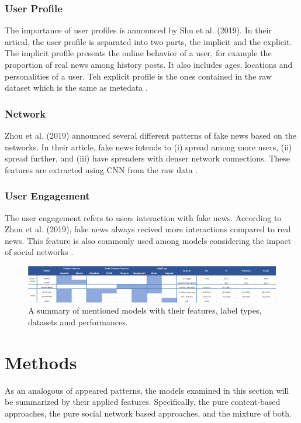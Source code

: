 \documentclass[sigconf ,nonacm]{acmart}
\begin{document}
\subsubsection{User Profile} The importance of user profiles is announced by Shu et al. (2019). In their artical, the user profile is separated into two parts, the implicit and the explicit. The implicit profile presents the online behavior of a user, for example the proportion of real news among history posts. It also includes ages, locations and personalities of a user. Teh explicit profile is the ones contained in the raw dataset which is the same as metedata \cite{UserProfile}. 

\subsubsection{Network} Zhou et al. (2019) announced several different patterns of fake news based on the networks. In their article, fake news intends to (i) spread among more users, (ii) spread further, and (iii) have spreaders with denser network connections. These features are extracted using CNN from the raw data \cite{NetworkBased}.

\subsubsection{User Engagement} The user engagement refers to users interaction with fake news. According to Zhou et al. (2019), fake news always recived more interactions compared to real news. This feature is also commonly used among models considering the impact of social networks \cite{NetworkBased,MMFD,Unsupervised}.


\begin{figure}
  \centering
  \includegraphics[width=\linewidth]{summary.png}
  \caption{A summary of mentioned models with their features, label types, datasets amd performances.}
\end{figure}

\section{Methods}
As an analogous of appeared patterns, the models examined in this section will be summarized by their applied features. Specifically, the pure content-based approaches, the pure social network based approaches, and the mixture of both.
\end{document}
